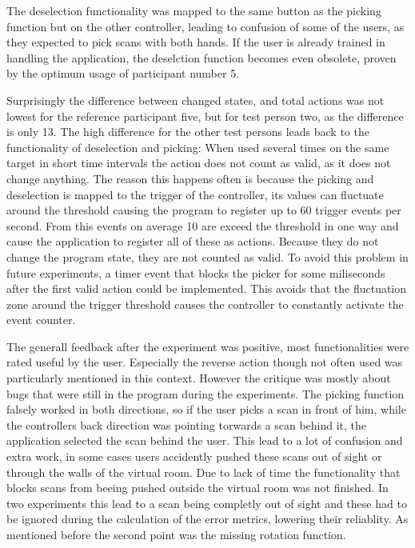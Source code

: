 \documentclass[hyperref,english,bachelorofscience,bibnum]{cgvpub}
\begin{document}
The deselection functionality was mapped to the same button as the picking function but on the other controller, leading to confusion of some of the users, as they expected to pick scans with both hands. If the user is already trained in handling the application, the deselction function becomes even obsolete, proven by the optimum usage of participant number 5. 

Surprisingly the difference between changed states, and total actions was not lowest for the reference participant five, but for test person two, as the difference is only 13. The  high difference for the other test persons leads back to the functionality of deselection and picking: When used several times on the same target in short time intervals the action does not count as valid, as it does not change anything. The reason this happens often is because the picking and deselection is mapped to the trigger of the controller, its values can fluctuate around the threshold causing the program to register up to 60 trigger events per second. From this events on average 10 are exceed the threshold in one way and cause the application to register all of these as actions. Because they do not change the program state, they are not counted as valid. To avoid this problem in future experiments, a timer event that blocks the picker for some miliseconds after the first valid action could be implemented. This avoids that the fluctuation zone around the trigger threshold causes the controller to constantly activate the event counter.

The generall feedback after the experiment was positive, most functionalities were rated useful by the user. Especially the reverse action though not often used was particularly mentioned in this context. However the critique was mostly about bugs that were still in the program during the experiments. The picking function falsely worked in both directions, so if the user picks a scan in front of him, while the controllers back direction was pointing torwards a scan behind it, the application selected the scan behind the user. This lead to a lot of confusion and extra work, in some cases users accidently pushed these scans out of sight or through the walls of the virtual room. Due to lack of time the functionality that blocks scans from beeing pushed outside the virtual room was not finished. In two experiments this lead to a scan being completly out of sight and these had to be ignored during the calculation of the error metrics, lowering their reliablity. As mentioned before the second point was the missing rotation function.
\end{document}
